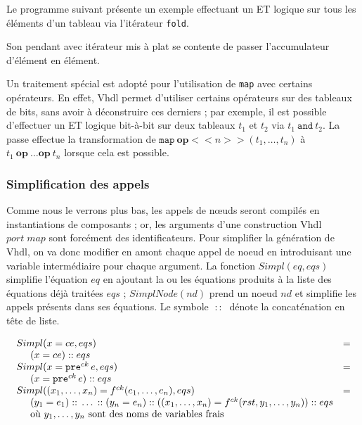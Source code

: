 \documentclass[a4paper]{article}
\newcommand{\vhdl}{{\sc Vhdl}}
\newcommand{\mybox}[1]{\mbox{\tt{#1}}}
\newcommand{\ind}[0]{\hspace{0.5cm}}
\newcommand{\Cons}[0]{\; \mathbf{::} \;}
\newcommand{\Pre}[1]{\mybox{pre}^{ck} \, #1}
\newcommand{\App}[2]{#1^{ck}(#2)}
\begin{document}
Le programme suivant présente un exemple effectuant un ET logique sur tous les
éléments d'un tableau via l'itérateur \texttt{fold}.



Son pendant avec itérateur mis à plat se contente de passer l'accumulateur
d'élément en élément.



Un traitement spécial est adopté pour l'utilisation de \texttt{map} avec
certains opérateurs. En effet, \vhdl{} permet d'utiliser certains opérateurs sur
des tableaux de bits, sans avoir à déconstruire ces derniers ; par exemple, il
est possible d'effectuer un ET logique bit-à-bit sur deux tableaux $t_1$ et
$t_2$ via $t_1 \ \texttt{and} \ t_2$. La passe effectue la transformation de
$\texttt{map}\ \textbf{op}<<n>>(t_1,\dots,t_n)$ à $t_1\ \textbf{op}\ \dots
\textbf{op}\ t_n$ lorsque cela est possible.

\subsubsection{Simplification des appels}

\newcommand{\simpl}[2]{Simpl(#1,#2)}
\newcommand{\simplnd}[1]{SimplNode(#1)}

Comme nous le verrons plus bas, les appels de nœuds seront compilés en
instantiations de composants ; or, les arguments d'une construction \vhdl{}
$port \; map$ sont forcément des identificateurs. Pour simplifier la
génération de \vhdl{}, on va donc modifier en amont chaque appel de noeud en
introduisant une variable intermédiaire pour chaque argument. La fonction
$\simpl{eq}{eqs}$ simplifie l'équation $eq$ en ajoutant la ou les équations
produits à la liste des équations déjà traitées $eqs$ ; $\simplnd{nd}$
prend un noeud $nd$ et simplifie les appels présents dans ses équations. Le
symbole $\Cons$ dénote la concaténation en tête de liste.

\[
\begin{array}{ll}
  \simpl{x = ce}{eqs} & = \\
  \ind (x = ce) \Cons eqs \\
  \simpl{x = \Pre{e}}{eqs} & = \\
  \ind (x = \Pre{e}) \Cons eqs \\

  \simpl{(x_1,\dots,x_n) = \App{f}{e_1,\dots,e_n}}{eqs} & = \\
  \ind (y_1 = e_1) \Cons \dots \Cons (y_n = e_n)
  \Cons ((x_1,\dots,x_n) = \App{f}{rst,y_1,\dots,y_n}) \Cons eqs \\
  \ind \mbox{où } y_1,\dots,y_n \mbox{ sont des noms de variables frais}
\end{array}
\]
\end{document}

